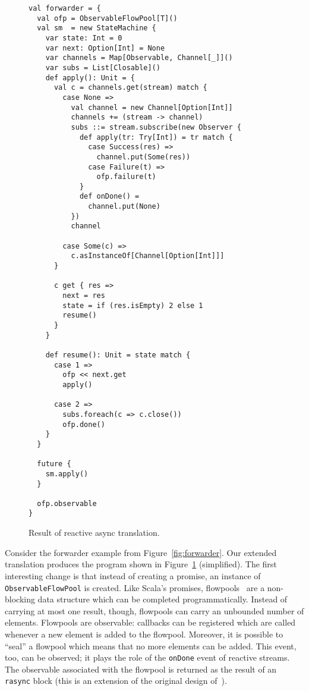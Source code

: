 \documentclass{acm_proc_article-sp}
\begin{document}
\begin{figure}[ht!]
  \centering
\lstset{numbers=left,xleftmargin=2em}
\begin{lstlisting}
val forwarder = {
  val ofp = ObservableFlowPool[T]()
  val sm  = new StateMachine {
    var state: Int = 0
    var next: Option[Int] = None
    var channels = Map[Observable, Channel[_]]()
    var subs = List[Closable]()
    def apply(): Unit = {
      val c = channels.get(stream) match {
        case None =>
          val channel = new Channel[Option[Int]]
          channels += (stream -> channel)
          subs ::= stream.subscribe(new Observer {
            def apply(tr: Try[Int]) = tr match {
              case Success(res) =>
                channel.put(Some(res))
              case Failure(t) =>
                ofp.failure(t)
            }
            def onDone() =
              channel.put(None)
          })
          channel

        case Some(c) =>
          c.asInstanceOf[Channel[Option[Int]]]
      }

      c get { res =>
        next = res
        state = if (res.isEmpty) 2 else 1
        resume()
      }
    }

    def resume(): Unit = state match {
      case 1 =>
        ofp << next.get
        apply()

      case 2 =>
        subs.foreach(c => c.close())
        ofp.done()
    }
  }

  future {
    sm.apply()
  }

  ofp.observable
}
\end{lstlisting}
  \caption{Result of reactive async translation.}
  \label{fig:rasync-translation}
\end{figure}

Consider the forwarder example from Figure~\ref{fig:forwarder}. Our extended
translation produces the program shown in Figure~\ref{fig:rasync-translation}
(simplified). The first interesting change is that instead of creating a
promise, an instance of \verb|ObservableFlowPool| is created. Like Scala's
promises, flowpools~\cite{ProkopecMSHO12} are a non-blocking data structure
which can be completed programmatically. Instead of carrying at most one
result, though, flowpools can carry an unbounded number of elements. Flowpools
are observable: callbacks can be registered which are called whenever a new
element is added to the flowpool. Moreover, it is possible to ``seal'' a
flowpool which means that no more elements can be added. This event, too, can
be observed; it plays the role of the \verb|onDone| event of reactive streams.
The observable associated with the flowpool is returned as the result of an
\verb|rasync| block (this is an extension of the original design
of~\cite{ProkopecMSHO12}).
\end{document}

